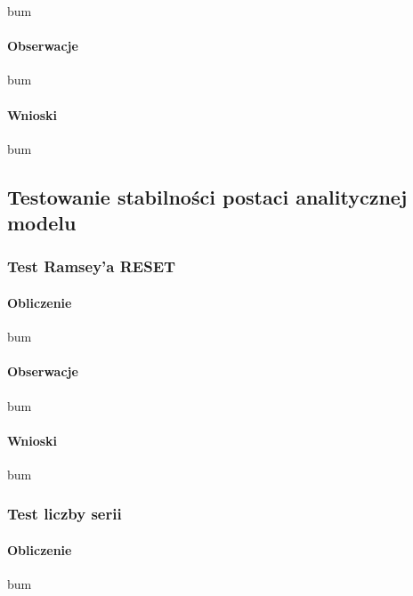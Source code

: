 \documentclass[
  11pt,
]{article}
\begin{document}
bum

\paragraph{Obserwacje}\label{obserwacje-13}

bum

\paragraph{Wnioski}\label{wnioski-13}

bum

\subsection{Testowanie stabilności postaci analitycznej
modelu}\label{testowanie-stabilnoux15bci-postaci-analitycznej-modelu}

\subsubsection{Test Ramsey'a RESET}\label{test-ramseya-reset}

\paragraph{Obliczenie}\label{obliczenie-10}

bum

\paragraph{Obserwacje}\label{obserwacje-14}

bum

\paragraph{Wnioski}\label{wnioski-14}

bum

\subsubsection{Test liczby serii}\label{test-liczby-serii}

\paragraph{Obliczenie}\label{obliczenie-11}

bum
\end{document}
